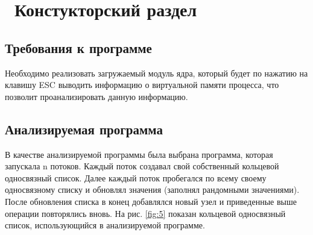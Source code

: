 \chapter{ Констукторский раздел}
\label{cha:design}




\section{Требования к программе}

Необходимо реализовать загружаемый модуль ядра, который будет 
по нажатию на клавишу ESC выводить информацию о виртуальной памяти процесса,
что позволит проанализировать данную информацию.


\section{Анализируемая программа}

В качестве анализируемой программы  была выбрана программа, 
которая запускала n потоков. 
Каждый поток создавал свой собственный кольцевой односвязный список.
Далее каждый поток пробегался по всему своему односвязному списку 
и обновлял значения (заполнял рандомными значениями).
После обновления списка в конец добавлялся новый узел 
и приведенные выше операции повторялись вновь. 
На рис. \ref{fig:5} показан кольцевой односвязный список, использующийся в анализируемой программе.

\begin{figure}[ht!]
\end{figure}

